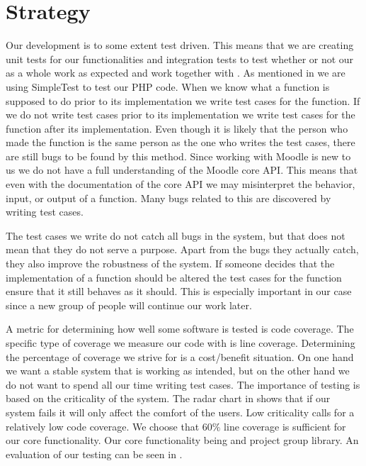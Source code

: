 \section{Strategy}
\label{sec:strategy}
\newcommand{\idealCC}{\todo{gerne en kilde p\aa{} at det er et godt tal}$60\%$}
Our development is to some extent test driven.
This means that we are creating unit tests for our functionalities and integration tests to test whether or not our \subsystem{} as a whole work as expected and work together with \moodle{}.
As mentioned in  we are using SimpleTest to test our PHP code.
When we know what a function is supposed to do prior to its implementation we write test cases for the function.
If we do not write test cases prior to its implementation we write test cases for the function after its implementation.
Even though it is likely that the person who made the function is the same person as the one who writes the test cases, there are still bugs to be found by this method.
Since working with Moodle is new to us we do not have a full understanding of the Moodle core API.
This means that even with the documentation of the \moodle{} core API we may misinterpret the behavior, input, or output of a function.
Many bugs related to this are discovered by writing test cases.

The test cases we write do not catch all bugs in the system, but that does not mean that they do not serve a purpose.
Apart from the bugs they actually catch, they also improve the robustness of the system.
If someone decides that the implementation of a function should be altered the test cases for the function ensure that it still behaves as it should.
This is especially important in our case since a new group of people will continue our work later.

A metric for determining how well some software is tested is code coverage. 
The specific type of coverage we measure our code with is line coverage. 
Determining the percentage of coverage we strive for is a cost/benefit situation.
On one hand we want a stable system that is working as intended, but on the other hand we do not want to spend all our time writing test cases.
The importance of testing is based on the criticality of the system.
The radar chart in  shows that if our system fails it will only affect the comfort of the users.
Low criticality calls for a relatively low code coverage.
We choose that \idealCC{} line coverage is sufficient for our core functionality.
Our core functionality being \admlib{} and project group library.
An evaluation of our testing can be seen in .

